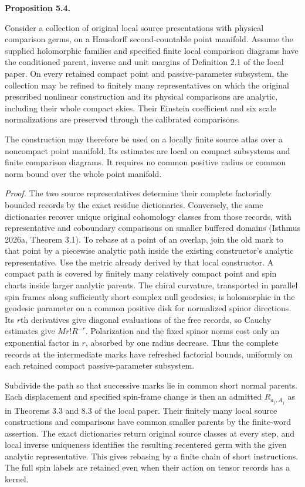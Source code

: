 \documentclass[
  english,
  11pt,
  reqno]{amsart}
\makeatletter
\newcommand{\pandocstatementheading}[1]{%
  \par\addpenalty{\@beginparpenalty}%
  \addvspace{.5\baselineskip plus .2\baselineskip minus .2\baselineskip}%
  {\normalfont\bfseries #1\par}%
  \nobreak\@afterindenttrue\@afterheading
}
\makeatother
\begin{document}
\pandocstatementheading{\protect{}\label{prop:source-atlas-local-analytic-execution}Proposition 5.4.}

Consider a collection of original local source presentations with
physical comparison germs, on a Hausdorff second-countable point
manifold. Assume the supplied holomorphic families and specified finite
local comparison diagrams have the conditioned parent, inverse and unit
margins of Definition 2.1 of the local paper. On every retained compact
point and passive-parameter subsystem, the collection may be refined to
finitely many representatives on which the original prescribed nonlinear
construction and its physical comparisons are analytic, including their
whole compact skies. Their Einstein coefficient and six scale
normalizations are preserved through the calibrated comparisons.

The construction may therefore be used on a locally finite source atlas
over a noncompact point manifold. Its estimates are local on compact
subsystems and finite comparison diagrams. It requires no common
positive radius or common norm bound over the whole point manifold.

\emph{Proof.} The two source representatives determine their complete
factorially bounded records by the exact residue dictionaries.
Conversely, the same dictionaries recover unique original cohomology
classes from those records, with representative and coboundary
comparisons on smaller buffered domains (Isthmus 2026a, Theorem 3.1). To
rebase at a point of an overlap, join the old mark to that point by a
piecewise analytic path inside the existing constructor's analytic
representative. Use the metric already derived by that local
constructor. A compact path is covered by finitely many relatively
compact point and spin charts inside larger analytic parents. The chiral
curvature, transported in parallel spin frames along sufficiently short
complex null geodesics, is holomorphic in the geodesic parameter on a
common positive disk for normalized spinor directions. Its \(r\)th
derivatives give diagonal evaluations of the free records, so Cauchy
estimates give \(M r!R^{-r}\). Polarization and the fixed spinor norms
cost only an exponential factor in \(r\), absorbed by one radius
decrease. Thus the complete records at the intermediate marks have
refreshed factorial bounds, uniformly on each retained compact
passive-parameter subsystem.

Subdivide the path so that successive marks lie in common short normal
parents. Each displacement and specified spin-frame change is then an
admitted \(R_{a_j,A_j}\) as in Theorems 3.3 and 8.3 of the local paper.
Their finitely many local source constructions and comparisons have
common smaller parents by the finite-word assertion. The exact
dictionaries return original source classes at every step, and local
inverse uniqueness identifies the resulting recentered germ with the
given analytic representative. This gives rebasing by a finite chain of
short instructions. The full spin labels are retained even when their
action on tensor records has a kernel.
\end{document}
